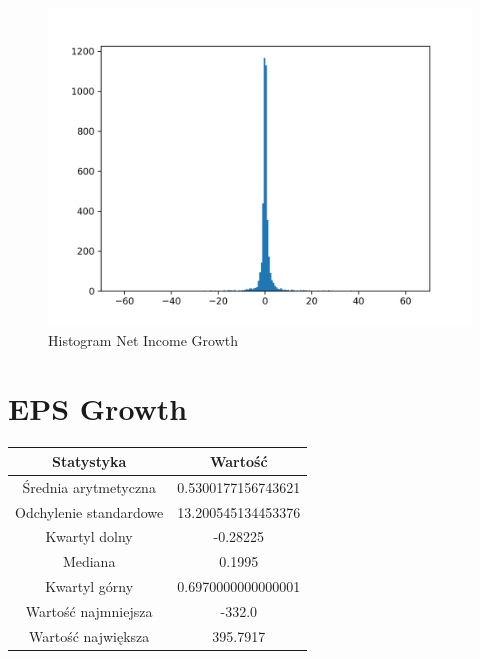 \documentclass{article}
\begin{document}
\begin{figure}[h!]
    \includegraphics[width=\linewidth]{variables/Net Income Growth.png}
    \caption{Histogram Net Income Growth }
\end{figure}\section{ EPS Growth }

\begin{center}
    \begin{tabular}{|c | c|} 
    \hline
    Statystyka & Wartość \\
    \hline\hline
    Średnia arytmetyczna & 0.5300177156743621 \\ 
    \hline
    Odchylenie standardowe & 13.200545134453376 \\
    \hline
    Kwartyl dolny & -0.28225 \\
    \hline
    Mediana & 0.1995 \\
    \hline
    Kwartyl górny & 0.6970000000000001 \\
    \hline
    Wartość najmniejsza & -332.0 \\
    \hline
    Wartość największa & 395.7917 \\
    \hline
   \end{tabular}
\end{center}
\end{document}
